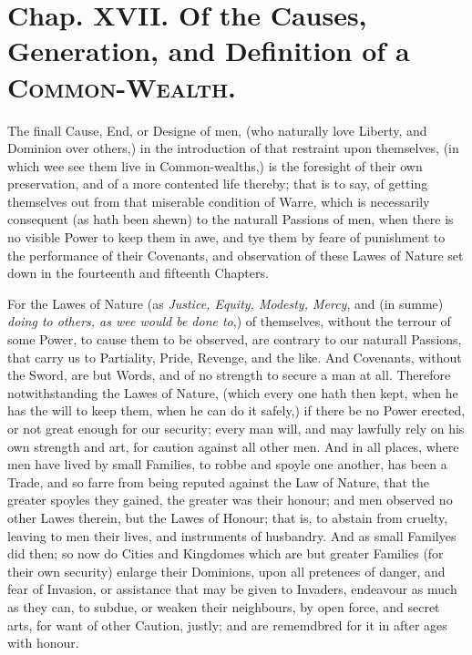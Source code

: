 
\section{Chap. XVII. Of the Causes, Generation, and
Definition of a \textsc{Common-Wealth}.}

The finall Cause, End, or Designe of men, (who naturally love Liberty,
and Dominion over others,) in the introduction of that restraint upon
themselves, (in which wee see them live in Common-wealths,) is the
foresight of their own preservation, and of a more contented life
thereby; that is to say, of getting themselves out from that miserable
condition of Warre, which is necessarily consequent (as hath been
shewn) to the naturall Passions of men, when there is no visible Power
to keep them in awe, and tye them by feare of punishment to the
performance of their Covenants, and observation of these Lawes of
Nature set down in the fourteenth and fifteenth Chapters.

For the Lawes of Nature (as \textit{Justice, Equity, Modesty, Mercy},
and (in summe) \textit{doing to others, as wee would be done to},) of
themselves, without the terrour of some Power, to cause them to be
observed, are contrary to our naturall Passions, that carry us to
Partiality, Pride, Revenge, and the like. And Covenants, without the
Sword, are but Words, and of no strength to secure a man at all.
Therefore notwithstanding the Lawes of Nature, (which every one hath
then kept, when he has the will to keep them, when he can do it
safely,) if there be no Power erected, or not great enough for our
security; every man will, and may lawfully rely on his own strength
and art, for caution against all other men. And in all places,
 where men have lived by small Families, to robbe and spoyle
one another, has been a Trade, and so farre from being reputed against
the Law of Nature, that the greater spoyles they gained, the greater
was their honour; and men observed no other Lawes therein, but the
Lawes of Honour; that is, to abstain from cruelty, leaving to men
their lives, and instruments of husbandry. And as small Familyes did
then; so now do Cities and Kingdomes which are but greater Families
(for their own security) enlarge their Dominions, upon all pretences
of danger, and fear of Invasion, or assistance that may be given to
Invaders, endeavour as much as they can, to subdue, or weaken their
neighbours, by open force, and secret arts, for want of other Caution,
justly; and are rememdbred for it in after ages with honour.

